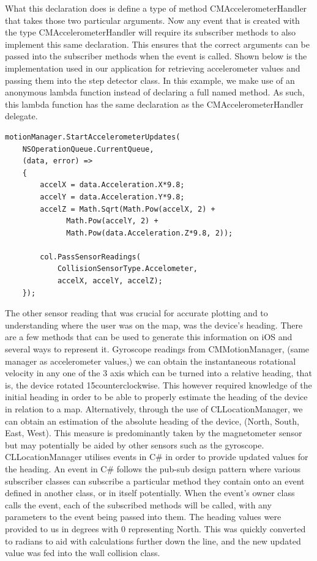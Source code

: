 \documentclass[12pt,a4paper]{report}
\begin{document}
What this declaration does is define a type of method CMAccelerometerHandler that takes those two particular arguments. Now any event that is created with the type CMAccelerometerHandler will require its subscriber methods to also implement this same declaration. This ensures that the correct arguments can be passed into the subscriber methods when the event is called. Shown below is the implementation used in our application for retrieving accelerometer values and passing them into the step detector class. In this example, we make use of an anonymous lambda function instead of declaring a full named method. As such, this lambda function has the same declaration as the CMAccelerometerHandler delegate.
\begin{lstlisting}
motionManager.StartAccelerometerUpdates(
	NSOperationQueue.CurrentQueue,
	(data, error) =>
	{
		accelX = data.Acceleration.X*9.8;
		accelY = data.Acceleration.Y*9.8;
		accelZ = Math.Sqrt(Math.Pow(accelX, 2) + 
			  Math.Pow(accelY, 2) + 
			  Math.Pow(data.Acceleration.Z*9.8, 2));

		col.PassSensorReadings(
			CollisionSensorType.Accelometer, 
			accelX, accelY, accelZ);
	});
\end{lstlisting}

The other sensor reading that was crucial for accurate plotting and to understanding where the user was on the map, was the device’s heading. There are a few methods that can be used to generate this information on iOS and several ways to represent it. Gyroscope readings from CMMotionManager, (same manager as accelerometer values,) we can obtain the instantaneous rotational velocity in any one of the 3 axis which can be turned into a relative heading, that is, the device rotated 15\textdegree counterclockwise. This however required knowledge of the initial heading in order to be able to properly estimate the heading of the device in relation to a map. Alternatively, through the use of CLLocationManager, we can obtain an estimation of the absolute heading of the device, (North, South, East, West). This measure is predominantly taken by the magnetometer sensor but may potentially be aided by other sensors such as the gyroscope. CLLocationManager utilises events in C\# in order to provide updated values for the heading. An event in C\# follows the pub-sub design pattern where various subscriber classes can subscribe a particular method they contain onto an event defined in another class, or in itself potentially. When the event’s owner class calls the event, each of the subscribed methods will be called, with any parameters to the event being passed into them. The heading values were provided to us in degrees with 0 representing North. This was quickly converted to radians to aid with calculations further down the line, and the new updated value was fed into the wall collision class.
\end{document}
